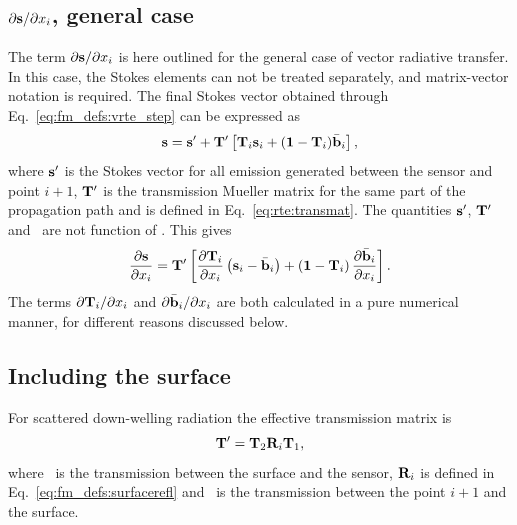 \subsection{$\partial{\bf s}/\partial x_{i}$, general 
case}
\label{sec:wfuns:atmvars:gene}
%
The term $\partial{\bf s}/\partial x_{i}$ is here outlined for the general case
of vector radiative transfer. In this case, the Stokes elements can not be
treated separately, and matrix-vector notation is required. The final Stokes
vector obtained through Eq.~\ref{eq:fm_defs:vrte_step} can be expressed as
\begin{equation}
  \label{eq:s4J}
  {\bf s} = {\bf s}' + \mathbf{T}' \left[ \mathbf{T}_{i} {\bf s}_{i} +
         (\mathbf{1}-\mathbf{T}_{i})\bar{{\bf b}}_i \right],
\end{equation}
where ${\bf s}'$ is the Stokes vector for all emission generated between the
sensor and point $i+1$, $\mathbf{T}'$ is the transmission Mueller matrix for the
same part of the propagation path and  is defined in
Eq.~\ref{eq:rte:transmat}. The quantities ${\bf s}'$, $\mathbf{T}'$ and
\ are not function of . This gives
\begin{equation}
  \frac{\partial{\bf s}}{\partial x_{i}} = \mathbf{T}'
  \left[
    \frac{\partial\mathbf{T}_{i}}{\partial x_{i}}
      \left( {\bf s}_{i}-\bar{{\bf b}}_i \right) +
    \left( \mathbf{1}-\mathbf{T}_{i} \right) 
      \frac{\partial\bar{{\bf b}}_i}{\partial x_{i}}
  \right].
  \label{eq:wfuns:dsdxi1}
\end{equation}
The terms $\partial\mathbf{T}_{i}/\partial x_{i}$ and
$\partial\bar{{\bf b}}_i/\partial x_{i}$ are both calculated in a pure
numerical manner, for different reasons discussed below.


\subsection{Including the surface}
%
For scattered down-welling radiation the effective transmission matrix is
\begin{equation}
  \mathbf{T}' = \mathbf{T}_{2}\mathbf{R}_i\mathbf{T}_{1},
  \label{eq:wfuns:surface}
\end{equation}
where \ is the transmission between the surface and the sensor,
$\mathbf{R}_i$ is defined in Eq.~\ref{eq:fm_defs:surfacerefl} and
\ is the transmission between the point $i+1$ and the surface.



